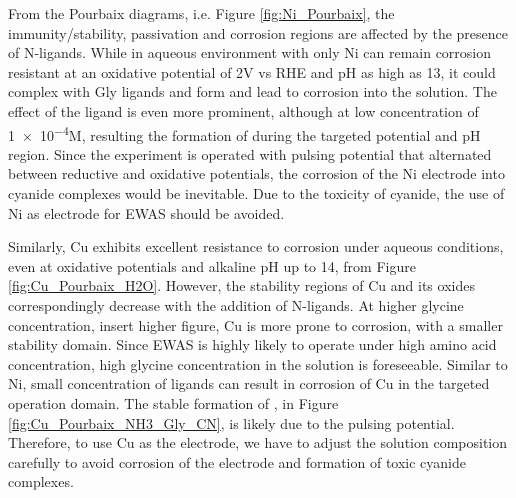 \documentclass[journal=jacsat,manuscript=article]{achemso}
\begin{document}
From the Pourbaix diagrams, i.e. Figure \ref{fig:Ni_Pourbaix}, the immunity/stability, passivation and corrosion regions are affected by the presence of N-ligands. While in aqueous environment with only  Ni can remain corrosion resistant at an oxidative potential of 2V vs RHE and pH as high as 13, it could complex with Gly ligands and form \ce{[Ni(Gly)3^-]} and lead to corrosion into the solution. The effect of the  ligand is even more prominent, although at low concentration of \num{1e-4}M, resulting the formation \ce{[Ni(CN)4^2-]} of during the targeted potential and pH region. Since the experiment is operated with pulsing potential that alternated between reductive and oxidative potentials, the corrosion of the Ni electrode into cyanide complexes would be inevitable. Due to the toxicity of cyanide\cite{Bhattacharya2009CyanideTreatment}, the use of Ni as electrode for EWAS should be avoided. 



Similarly, Cu exhibits excellent resistance to corrosion under aqueous conditions, even at oxidative potentials and alkaline pH up to 14, from Figure \ref{fig:Cu_Pourbaix_H2O}. However, the stability regions of Cu and its oxides correspondingly decrease with the addition of N-ligands\cite{Wang2022ThermodynamicDiagrams}. At higher glycine concentration, insert higher figure, Cu is more prone to corrosion, with a smaller stability domain. Since EWAS is highly likely to operate under high amino acid concentration, high glycine concentration in the solution is foreseeable. Similar to Ni, small concentration of  ligands can result in corrosion of Cu in the targeted operation domain. The stable formation of , in Figure \ref{fig:Cu_Pourbaix_NH3_Gly_CN}, is likely due to the pulsing potential. Therefore, to use Cu as the electrode, we have to adjust the solution composition carefully to avoid corrosion of the electrode and formation of toxic cyanide complexes. 
\end{document}
